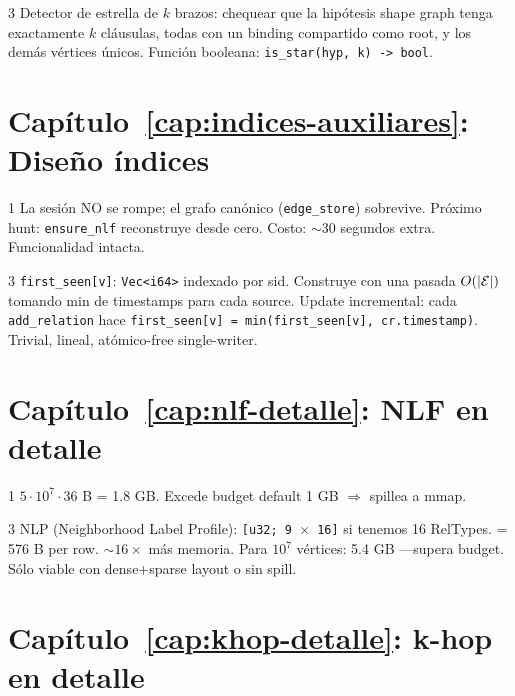 \begin{solucion}{3}
Detector de estrella de \(k\) brazos: chequear que la hipótesis
shape graph tenga exactamente \(k\) cláusulas, todas con un
binding compartido como root, y los demás vértices únicos. Función
booleana: \texttt{is\_star(hyp, k) -> bool}.
\end{solucion}

\section*{Capítulo~\ref{cap:indices-auxiliares}: Diseño índices}

\begin{solucion}{1}
La sesión NO se rompe; el grafo canónico (\texttt{edge\_store})
sobrevive. Próximo hunt: \texttt{ensure\_nlf} reconstruye desde
cero. Costo: $\sim$30 segundos extra. Funcionalidad intacta.
\end{solucion}

\begin{solucion}{3}
\texttt{first\_seen[v]}: \texttt{Vec<i64>} indexado por sid.
Construye con una pasada \(O(|\mathcal{E}|)\) tomando min de timestamps
para cada source. Update incremental: cada
\texttt{add\_relation} hace \texttt{first\_seen[v] =
min(first\_seen[v], cr.timestamp)}. Trivial, lineal, atómico-free
single-writer.
\end{solucion}

\section*{Capítulo~\ref{cap:nlf-detalle}: NLF en detalle}

\begin{solucion}{1}
\(5 \cdot 10^7 \cdot 36\) B = 1.8 GB. Excede budget default 1 GB
$\Rightarrow$ spillea a mmap.
\end{solucion}

\begin{solucion}{3}
NLP (Neighborhood Label Profile): \texttt{[u32; 9 \(\times\) 16]}
si tenemos 16 RelTypes. = 576 B per row. \(\sim 16\times\) más
memoria. Para \(10^7\) vértices: 5.4 GB ---supera budget. Sólo
viable con dense+sparse layout o sin spill.
\end{solucion}

\section*{Capítulo~\ref{cap:khop-detalle}: k-hop en detalle}

